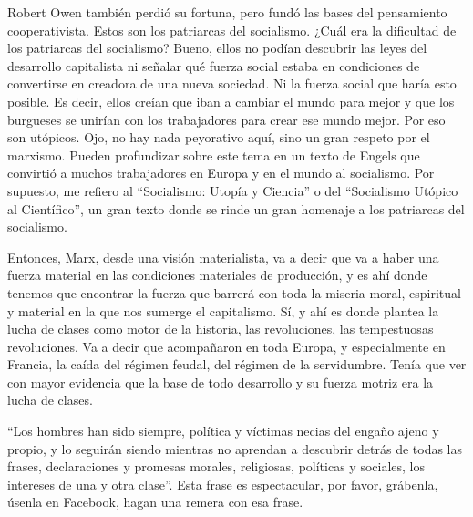 \documentclass[
  a4paper,
]{article}
\begin{document}
Robert Owen también perdió su fortuna, pero fundó las bases del
pensamiento cooperativista. Estos son los patriarcas del socialismo.
¿Cuál era la dificultad de los patriarcas del socialismo? Bueno, ellos
no podían descubrir las leyes del desarrollo capitalista ni señalar qué
fuerza social estaba en condiciones de convertirse en creadora de una
nueva sociedad. Ni la fuerza social que haría esto posible. Es decir,
ellos creían que iban a cambiar el mundo para mejor y que los burgueses
se unirían con los trabajadores para crear ese mundo mejor. Por eso son
utópicos. Ojo, no hay nada peyorativo aquí, sino un gran respeto por el
marxismo. Pueden profundizar sobre este tema en un texto de Engels que
convirtió a muchos trabajadores en Europa y en el mundo al socialismo.
Por supuesto, me refiero al ``Socialismo: Utopía y Ciencia'' o del
``Socialismo Utópico al Científico'', un gran texto donde se rinde un
gran homenaje a los patriarcas del socialismo.

Entonces, Marx, desde una visión materialista, va a decir que va a haber
una fuerza material en las condiciones materiales de producción, y es
ahí donde tenemos que encontrar la fuerza que barrerá con toda la
miseria moral, espiritual y material en la que nos sumerge el
capitalismo. Sí, y ahí es donde plantea la lucha de clases como motor de
la historia, las revoluciones, las tempestuosas revoluciones. Va a decir
que acompañaron en toda Europa, y especialmente en Francia, la caída del
régimen feudal, del régimen de la servidumbre. Tenía que ver con mayor
evidencia que la base de todo desarrollo y su fuerza motriz era la lucha
de clases.

``Los hombres han sido siempre, política y víctimas necias del engaño
ajeno y propio, y lo seguirán siendo mientras no aprendan a descubrir
detrás de todas las frases, declaraciones y promesas morales,
religiosas, políticas y sociales, los intereses de una y otra clase''.
Esta frase es espectacular, por favor, grábenla, úsenla en Facebook,
hagan una remera con esa frase.
\end{document}
